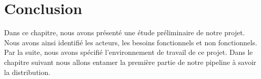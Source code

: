 \section*{Conclusion}
Dans ce chapitre, nous avons présenté une étude préliminaire de notre projet. Nous avons ainsi identifié les acteurs, les besoins fonctionnels et non fonctionnels. Par la suite, nous avons spécifié l’environnement de travail de ce projet. Dans le chapitre suivant nous allons entamer la première partie de notre pipeline à savoir la distribution.
